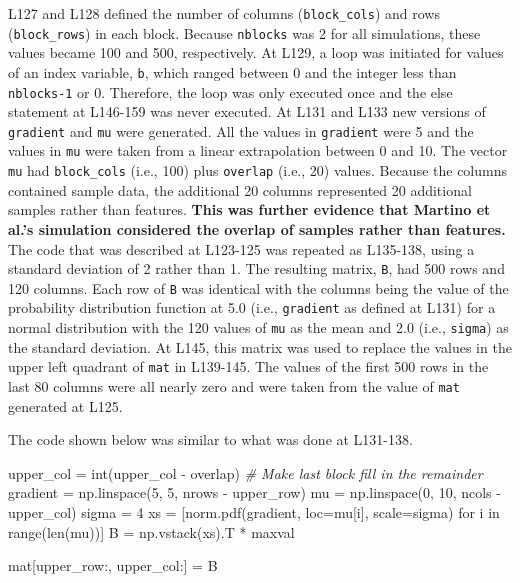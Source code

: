 \documentclass[
]{article}
\newenvironment{Shaded}{}{}
\newcommand{\BuiltInTok}[1]{\textcolor[rgb]{0.65,0.15,0.64}{#1}}
\newcommand{\CommentTok}[1]{\textcolor[rgb]{0.63,0.63,0.65}{\textit{#1}}}
\newcommand{\ControlFlowTok}[1]{\textcolor[rgb]{0.65,0.15,0.64}{#1}}
\newcommand{\DecValTok}[1]{\textcolor[rgb]{0.60,0.41,0.00}{#1}}
\newcommand{\KeywordTok}[1]{\textcolor[rgb]{0.65,0.15,0.64}{#1}}
\newcommand{\NormalTok}[1]{\textcolor[rgb]{0.22,0.23,0.26}{#1}}
\newcommand{\OperatorTok}[1]{\textcolor[rgb]{0.65,0.15,0.64}{#1}}
\begin{document}
\normalsize{}

L127 and L128 defined the number of columns (\texttt{block\_cols}) and
rows (\texttt{block\_rows}) in each block. Because \texttt{nblocks} was
2 for all simulations, these values became 100 and 500, respectively. At
L129, a loop was initiated for values of an index variable, \texttt{b},
which ranged between 0 and the integer less than \texttt{nblocks-1} or
0. Therefore, the loop was only executed once and the else statement at
L146-159 was never executed. At L131 and L133 new versions of
\texttt{gradient} and \texttt{mu} were generated. All the values in
\texttt{gradient} were 5 and the values in \texttt{mu} were taken from a
linear extrapolation between 0 and 10. The vector \texttt{mu} had
\texttt{block\_cols} (i.e., 100) plus \texttt{overlap} (i.e., 20)
values. Because the columns contained sample data, the additional 20
columns represented 20 additional samples rather than features.
\textbf{This was further evidence that Martino et al.'s simulation
considered the overlap of samples rather than features.} The code that
was described at L123-125 was repeated as L135-138, using a standard
deviation of 2 rather than 1. The resulting matrix, \texttt{B}, had 500
rows and 120 columns. Each row of \texttt{B} was identical with the
columns being the value of the probability distribution function at 5.0
(i.e., \texttt{gradient} as defined at L131) for a normal distribution
with the 120 values of \texttt{mu} as the mean and 2.0 (i.e.,
\texttt{sigma}) as the standard deviation. At L145, this matrix was used
to replace the values in the upper left quadrant of \texttt{mat} in
L139-145. The values of the first 500 rows in the last 80 columns were
all nearly zero and were taken from the value of \texttt{mat} generated
at L125.

The code shown below was similar to what was done at L131-138.

\footnotesize

\begin{Shaded}
\begin{Highlighting}[numbers=left,,firstnumber=161,]
\NormalTok{    upper\_col }\OperatorTok{=} \BuiltInTok{int}\NormalTok{(upper\_col }\OperatorTok{{-}}\NormalTok{ overlap)}
    \CommentTok{\# Make last block fill in the remainder}
\NormalTok{    gradient }\OperatorTok{=}\NormalTok{ np.linspace(}\DecValTok{5}\NormalTok{, }\DecValTok{5}\NormalTok{, nrows }\OperatorTok{{-}}\NormalTok{ upper\_row)}
\NormalTok{    mu }\OperatorTok{=}\NormalTok{ np.linspace(}\DecValTok{0}\NormalTok{, }\DecValTok{10}\NormalTok{, ncols }\OperatorTok{{-}}\NormalTok{ upper\_col)}
\NormalTok{    sigma }\OperatorTok{=} \DecValTok{4}
\NormalTok{    xs }\OperatorTok{=}\NormalTok{ [norm.pdf(gradient, loc}\OperatorTok{=}\NormalTok{mu[i], scale}\OperatorTok{=}\NormalTok{sigma)}
          \ControlFlowTok{for}\NormalTok{ i }\KeywordTok{in} \BuiltInTok{range}\NormalTok{(}\BuiltInTok{len}\NormalTok{(mu))]}
\NormalTok{    B }\OperatorTok{=}\NormalTok{ np.vstack(xs).T }\OperatorTok{*}\NormalTok{ maxval}

\NormalTok{    mat[upper\_row:, upper\_col:] }\OperatorTok{=}\NormalTok{ B}
\end{Highlighting}
\end{Shaded}
\end{document}
